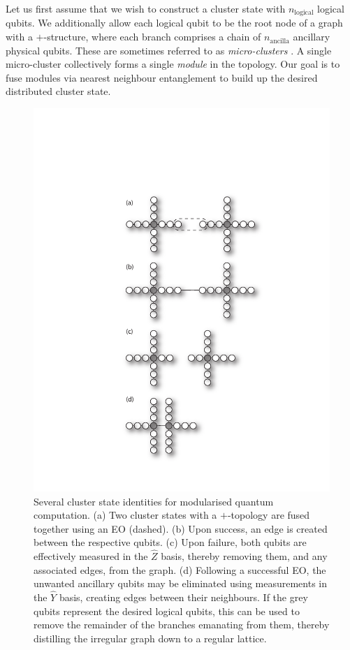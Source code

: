 Let us first assume that we wish to construct a cluster state with $n_\mathrm{logical}$ logical qubits. We additionally allow each logical qubit to be the root node of a graph with a $+$-structure, where each branch comprises a chain of $n_\mathrm{ancilla}$ ancillary physical qubits. These are sometimes referred to as \textit{micro-clusters} \cite{bib:Nielsen04}. A single micro-cluster collectively forms a single \textit{module} in the topology. Our goal is to fuse modules via nearest neighbour entanglement to build up the desired distributed cluster state.

\begin{figure}[htpb]
\includegraphics[width=\textwidth]{cluster_ident}
\caption{Several cluster state identities for modularised quantum computation. (a) Two cluster states with a $+$-topology are fused together using an EO (dashed). (b) Upon success, an edge is created between the respective qubits. (c) Upon failure, both qubits are effectively measured in the $\hat{Z}$ basis, thereby removing them, and any associated edges, from the graph. (d) Following a successful EO, the unwanted ancillary qubits may be eliminated using measurements in the $\hat{Y}$ basis, creating edges between their neighbours. If the grey qubits represent the desired logical qubits, this can be used to remove the remainder of the branches emanating from them, thereby distilling the irregular graph down to a regular lattice.} \label{fig:plus_cluster_ident}
\end{figure}

